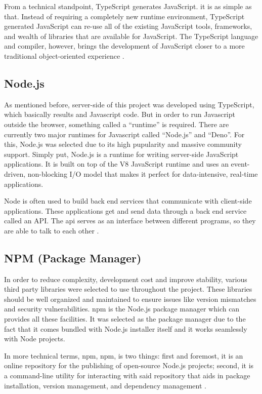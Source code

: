 \documentclass[12pt]{report}
\begin{document}
From a technical standpoint, TypeScript generates JavaScript. it is as simple as that. Instead of requiring a completely new runtime environment, TypeScript generated JavaScript can re-use all of the existing JavaScript tools, frameworks, and wealth of libraries that are available for JavaScript. The TypeScript language and compiler, however, brings the development of JavaScript closer to a more traditional object-oriented experience \cite{rozentals_2015_mastering}.

\subsection{Node.js}
As mentioned before, server-side of this project was developed using TypeScript, which basically results and Javascript code. But in order to run Javascript outside the browser, something called a ``runtime'' is required. There are currently two major runtimes for Javascript called ``Node.js'' and ``Deno''. For this, Node.js was selected due to its high pupularity and massive community support. Simply put, Node.js is a runtime for writing server-side JavaScript applications. It is built on top of the V8 JavaScript runtime and uses an event-driven, non-blocking I/O model that makes it perfect for data-intensive, real-time applications.

Node is often used to build back end services that communicate with client-side applications. These applications get and send data through a back end service called an API. The \acrshort{api} serves as an interface between different programs, so they are able to talk to each other \cite{teixeira_2013_professional}.

\subsection{NPM (Package Manager)}
In order to reduce complexity, development cost and improve stability, various third party libraries were selected to use throughout the project. These libraries should be well organized and maintained to ensure issues like version mismatches and security vulnerabilities. \acrshort{npm} is the Node.js package manager which can provides all these facilities. It was selected as the package manager due to the fact that it comes bundled with Node.js installer itself and it works seamlessly with Node projects.

In more technical terms, \acrshort{npm}, \acrlong{npm}, is two things: first and foremost, it is an online repository for the publishing of open-source Node.js projects; second, it is a command-line utility for interacting with said repository that aids in package installation, version management, and dependency management \cite{teixeira_2013_professional}.
\end{document}
